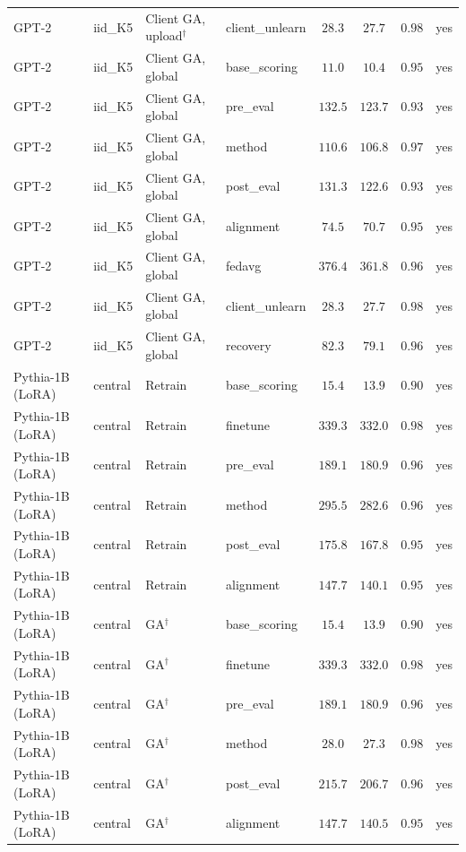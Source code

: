 {\begin{longtable}{@{\extracolsep{\fill}}llllcccc@{}}
GPT-2 & iid\_K5 & Client GA, upload$^{\dagger}$ & client\_unlearn & $28.3$ & $27.7$ & $0.98$ & yes \\
GPT-2 & iid\_K5 & Client GA, global & base\_scoring & $11.0$ & $10.4$ & $0.95$ & yes \\
GPT-2 & iid\_K5 & Client GA, global & pre\_eval & $132.5$ & $123.7$ & $0.93$ & yes \\
GPT-2 & iid\_K5 & Client GA, global & method & $110.6$ & $106.8$ & $0.97$ & yes \\
GPT-2 & iid\_K5 & Client GA, global & post\_eval & $131.3$ & $122.6$ & $0.93$ & yes \\
GPT-2 & iid\_K5 & Client GA, global & alignment & $74.5$ & $70.7$ & $0.95$ & yes \\
GPT-2 & iid\_K5 & Client GA, global & fedavg & $376.4$ & $361.8$ & $0.96$ & yes \\
GPT-2 & iid\_K5 & Client GA, global & client\_unlearn & $28.3$ & $27.7$ & $0.98$ & yes \\
GPT-2 & iid\_K5 & Client GA, global & recovery & $82.3$ & $79.1$ & $0.96$ & yes \\
Pythia-1B (LoRA) & central & Retrain & base\_scoring & $15.4$ & $13.9$ & $0.90$ & yes \\
Pythia-1B (LoRA) & central & Retrain & finetune & $339.3$ & $332.0$ & $0.98$ & yes \\
Pythia-1B (LoRA) & central & Retrain & pre\_eval & $189.1$ & $180.9$ & $0.96$ & yes \\
Pythia-1B (LoRA) & central & Retrain & method & $295.5$ & $282.6$ & $0.96$ & yes \\
Pythia-1B (LoRA) & central & Retrain & post\_eval & $175.8$ & $167.8$ & $0.95$ & yes \\
Pythia-1B (LoRA) & central & Retrain & alignment & $147.7$ & $140.1$ & $0.95$ & yes \\
Pythia-1B (LoRA) & central & GA$^{\dagger}$ & base\_scoring & $15.4$ & $13.9$ & $0.90$ & yes \\
Pythia-1B (LoRA) & central & GA$^{\dagger}$ & finetune & $339.3$ & $332.0$ & $0.98$ & yes \\
Pythia-1B (LoRA) & central & GA$^{\dagger}$ & pre\_eval & $189.1$ & $180.9$ & $0.96$ & yes \\
Pythia-1B (LoRA) & central & GA$^{\dagger}$ & method & $28.0$ & $27.3$ & $0.98$ & yes \\
Pythia-1B (LoRA) & central & GA$^{\dagger}$ & post\_eval & $215.7$ & $206.7$ & $0.96$ & yes \\
Pythia-1B (LoRA) & central & GA$^{\dagger}$ & alignment & $147.7$ & $140.5$ & $0.95$ & yes \\

\end{longtable}}
